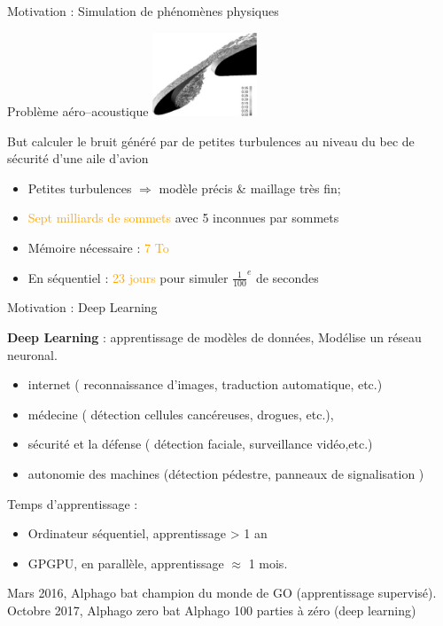 \documentclass[handout]{beamer}
\begin{document}
\begin{frame}[fragile]{Motivation : Simulation de phénomènes physiques}

\begin{block}{Problème aéro--acoustique}
\center\includegraphics[height=2.5cm]{SlatWingTurb1}
\end{block}

\begin{block}{But}
calculer le bruit généré par de petites turbulences au niveau du bec de sécurité d'une aile d'avion

\begin{itemize}
\item  Petites turbulences $\Rightarrow$ modèle précis \& maillage très fin;
\item \textcolor{orange}{Sept milliards de sommets} avec 5 inconnues par sommets
\item Mémoire nécessaire : \textcolor{orange}{7 To}
\item En séquentiel : \textcolor{orange}{23 jours} pour simuler $\frac{1}{100}^{e}$ de secondes
\end{itemize}
\end{block}
\end{frame}

\begin{frame}[fragile]{Motivation : Deep Learning}

\textbf{Deep Learning} : apprentissage de modèles de données, Modélise un réseau neuronal.

\begin{itemize}
 \item internet ( reconnaissance d'images, traduction automatique, etc.)
 \item médecine ( détection cellules cancéreuses, drogues, etc.),
 \item sécurité et la défense ( détection faciale, surveillance vidéo,etc.)
 \item autonomie des machines (détection pédestre, panneaux de signalisation )
\end{itemize}

Temps d'apprentissage :
\begin{itemize}
\item Ordinateur séquentiel, apprentissage  > 1 an
\item GPGPU, en parallèle, apprentissage $\approx$ 1 mois.
\end{itemize}

Mars 2016, Alphago bat champion du monde de GO (apprentissage supervisé). \\
Octobre 2017, Alphago zero bat Alphago 100 parties à zéro (deep learning)

\end{frame}
\end{document}
